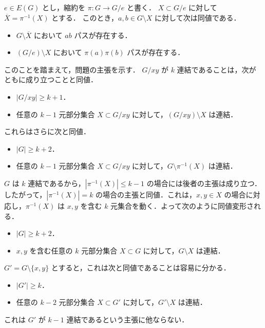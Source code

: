 \subsection{}
$e \in E(G)$ とし，縮約を $\pi\colon G\longrightarrow G/e$ と書く．
$X\subset G/e$ に対して $\overline{X} = \pi^{-1}(X)$ とする．
このとき，$a,b \in G\setminus X$ に対して次は同値である．
\begin{itemize}
 \item $G\setminus \overline{X}$ において $ab$ パスが存在する．
 \item $(G/e)\setminus X$ において $\pi(a)\pi(b)$ パスが存在する．
\end{itemize}

このことを踏まえて，問題の主張を示す．
$G/xy$ が $k$ 連結であることは，次がともに成り立つことと同値．
\begin{itemize}
 \item $|G/xy| \geq k + 1$．
 \item 任意の $k-1$ 元部分集合 $X\subset G/xy$ に対して，$(G/xy)\setminus X$ は連結．
\end{itemize}
これらはさらに次と同値．
\begin{itemize}
 \item $|G| \geq k + 2$．
 \item 任意の $k-1$ 元部分集合 $X\subset G/xy$ に対して，$G\setminus \pi^{-1}(X)$ は連結．
\end{itemize}
$G$ は $k$ 連結であるから，$|\pi^{-1}(X)| \leq k-1$ の場合には後者の主張は成り立つ．
したがって，$|\pi^{-1}(X)| = k$ の場合の主張と同値．これは，$x,y\in X$ の場合に対応し，$\pi^{-1}(X)$ は
$x,y$ を含む $k$ 元集合を動く．よって次のように同値変形される．
\begin{itemize}
 \item $|G| \geq k + 2$．
 \item $x,y$ を含む任意の $k$ 元部分集合 $X\subset G$ に対して，$G\setminus X$ は連結．
\end{itemize}
$G' = G\setminus\{x,y\}$ とすると，これは次と同値であることは容易に分かる．
\begin{itemize}
 \item $|G'| \geq k$．
 \item 任意の $k-2$ 元部分集合 $X\subset G'$ に対して，$G'\setminus X$ は連結．
\end{itemize}
これは $G'$ が $k-1$ 連結であるという主張に他ならない．